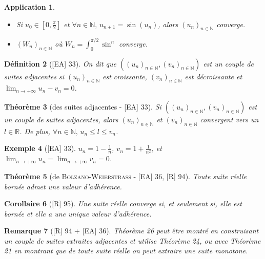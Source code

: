\documentclass[10pt, a4paper, parskip=full, twoside, twocolumn]{report}
\newtheorem{definition}{Définition}
\newtheorem{theorem}[definition]{Théorème}
\newtheorem{corollary}[definition]{Corollaire}
\newtheorem{example}[definition]{Exemple}
\newtheorem{remark}[definition]{Remarque}
\newtheorem{application}[definition]{Application}
\newcommand{\IN}{\mathbb{N}}
\newcommand{\IR}{\mathbb{R}}
\begin{document}
\begin{application}
	\begin{itemize}
		\item Si $u_0\in [0,\frac{\pi}{2}]$ et $\forall n\in \IN,\, u_{n+1}=\sin(u_n)$, alors $\left(u_n\right)_{n\in\IN}$ converge.
		\item $\left(W_n\right)_{n\in\IN}$ où $W_n = \int_{0}^{\pi/2}\sin^n$ converge.
	\end{itemize}
\end{application}

\begin{definition}[\textnormal{[EA] 33}]
	On dit que $\left(\left(u_n\right)_{n\in\IN},\left(v_n\right)_{n\in\IN}\right)$ est un \emph{couple de suites adjacentes} si $\left(u_n\right)_{n\in\IN}$ est croissante, $\left(v_n\right)_{n\in\IN}$ est décroissante et $\displaystyle{\lim_{n\to +\infty} u_n-v_n = 0}$.
\end{definition}

\begin{theorem}[des suites adjacentes - \textnormal{[EA] 33}]
	Si $\left(\left(u_n\right)_{n\in\IN},\left(v_n\right)_{n\in\IN}\right)$ est un couple de suites adjacentes, alors $\left(u_n\right)_{n\in\IN}$ et $\left(v_n\right)_{n\in\IN}$ convergent vers un $l\in\IR$.
	De plus, $\forall n\in\IN,\, u_n\leq l\leq v_n$.
\end{theorem}

\begin{example}[\textnormal{[EA] 33}]
	$u_n = 1 - \frac{1}{n}$, $v_n = 1+\frac{1}{n^2}$, et $\displaystyle{\lim_{n\to +\infty} u_n = \lim_{n\to +\infty} v_n = 0}$.
\end{example}

\begin{theorem}[de \textsc{Bolzano-Weierstrass} - \textnormal{[EA] 36, [R] 94}]
	Toute suite réelle bornée admet une valeur d'adhérence.
\end{theorem}

\begin{corollary}[\textnormal{[R] 95}]
	Une suite réelle converge si, et seulement si, elle est bornée et elle a une unique valeur d'adhérence.
\end{corollary}

\begin{remark}[\textnormal{[R] 94 + [EA] 36}]
	Théorème 26 peut être montré en construisant un couple de suites extraites adjacentes et utilise Théorème 24, ou avec Théorème 21 en montrant que de toute suite réelle on peut extraire une suite monotone.
\end{remark}
\end{document}
